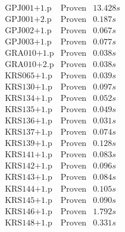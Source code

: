\documentclass[a4paper,11pt]{report}
\theoremstyle{definition}
\theoremstyle{definition}
\theoremstyle{definition}
\theoremstyle{definition}
\theoremstyle{definition}
\theoremstyle{definition}
\theoremstyle{definition}
\begin{document}
\begin{minipage}{0.45\textwidth}
\[\begin{matrix}
			\text{GPJ001+1.p}&\text{Proven}& 13.428 s\\
			\text{GPJ001+2.p}&\text{Proven}& 0.187 s\\
			\text{GPJ002+1.p}&\text{Proven}& 0.067 s\\
			\text{GPJ003+1.p}&\text{Proven}& 0.077 s\\
			\text{GRA010+1.p}&\text{Proven}& 0.038 s\\
			\text{GRA010+2.p}&\text{Proven}& 0.038 s\\
			\text{KRS065+1.p}&\text{Proven}& 0.039 s\\
			\text{KRS130+1.p}&\text{Proven}& 0.097 s\\
			\text{KRS134+1.p}&\text{Proven}& 0.052 s\\
			\text{KRS135+1.p}&\text{Proven}& 0.049 s\\
			\text{KRS136+1.p}&\text{Proven}& 0.031 s\\
			\text{KRS137+1.p}&\text{Proven}& 0.074 s\\
			\text{KRS139+1.p}&\text{Proven}& 0.128 s\\
			\text{KRS141+1.p}&\text{Proven}& 0.083 s\\
			\text{KRS142+1.p}&\text{Proven}& 0.096 s\\
			\text{KRS143+1.p}&\text{Proven}& 0.084 s\\
			\text{KRS144+1.p}&\text{Proven}& 0.105 s\\
			\text{KRS145+1.p}&\text{Proven}& 0.090 s\\
			\text{KRS146+1.p}&\text{Proven}& 1.792 s\\
			\text{KRS148+1.p}&\text{Proven}& 0.331 s\\
		\end{matrix}\]
	\end{minipage}
	
	\pagebreak
	
\end{document}
